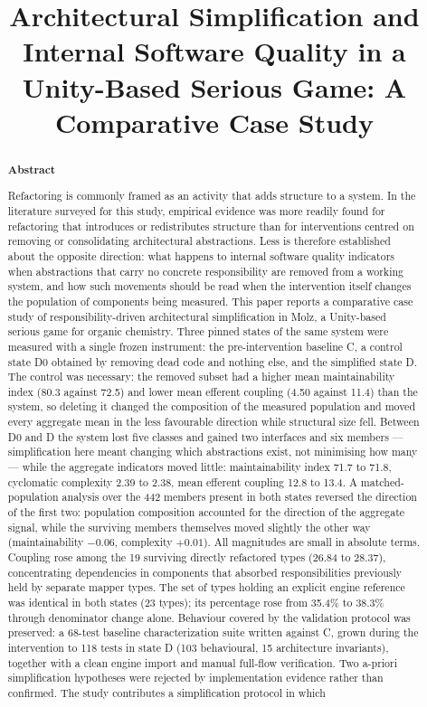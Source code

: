 \documentclass{sbc2019}%
\title[Architectural Simplification and Internal Software Quality]{Architectural Simplification and Internal Software Quality in a Unity-Based Serious Game: A Comparative Case Study}
\author[Rezende and Rocha 2026]{\affil{\textbf{Jo\~ao Guilherme Benjamin Alves de Rezende}\quad[~\textbf{Universidade Federal do Agreste de Pernambuco~}|\href{mailto:benj7100@gmail.com}{~\textbf{\textit{benj7100@gmail.com}}} ]}

\affil{\textbf{Rodrigo Gusm\~ao de Carvalho Rocha}\quad[~\textbf{Universidade Federal do Agreste de Pernambuco~}|\href{mailto:rodrigo.rocha@ufape.edu.br}{~\textbf{\textit{rodrigo.rocha@ufape.edu.br}}} ]}
}
\begin{document}
\begin{frontmatter}
\maketitle

\begin{abstract}
\textbf{Abstract}

Refactoring is commonly framed as an activity that adds structure to a system. In the literature surveyed for this study, empirical evidence was more readily found for refactoring that introduces or redistributes structure than for interventions centred on removing or consolidating architectural abstractions. Less is therefore established about the opposite direction: what happens to internal software quality indicators when abstractions that carry no concrete responsibility are removed from a working system, and how such movements should be read when the intervention itself changes the population of components being measured. This paper reports a comparative case study of responsibility-driven architectural simplification in Molz, a Unity-based serious game for organic chemistry. Three pinned states of the same system were measured with a single frozen instrument: the pre-intervention baseline C, a control state D0 obtained by removing dead code and nothing else, and the simplified state D. The control was necessary: the removed subset had a higher mean maintainability index (80.3 against 72.5) and lower mean efferent coupling (4.50 against 11.4) than the system, so deleting it changed the composition of the measured population and moved every aggregate mean in the less favourable direction while structural size fell. Between D0 and D the system lost five classes and gained two interfaces and six members --- simplification here meant changing which abstractions exist, not minimising how many --- while the aggregate indicators moved little: maintainability index 71.7 to 71.8, cyclomatic complexity 2.39 to 2.38, mean efferent coupling 12.8 to 13.4. A matched-population analysis over the 442 members present in both states reversed the direction of the first two: population composition accounted for the direction of the aggregate signal, while the surviving members themselves moved slightly the other way (maintainability $-0.06$, complexity $+0.01$). All magnitudes are small in absolute terms. Coupling rose among the 19 surviving directly refactored types (26.84 to 28.37), concentrating dependencies in components that absorbed responsibilities previously held by separate mapper types. The set of types holding an explicit engine reference was identical in both states (23 types); its percentage rose from 35.4\% to 38.3\% through denominator change alone. Behaviour covered by the validation protocol was preserved: a 68-test baseline characterization suite written against C, grown during the intervention to 118 tests in state D (103 behavioural, 15 architecture invariants), together with a clean engine import and manual full-flow verification. Two a-priori simplification hypotheses were rejected by implementation evidence rather than confirmed. The study contributes a simplification protocol in which 
\end{abstract}
\end{frontmatter}
\end{document}
